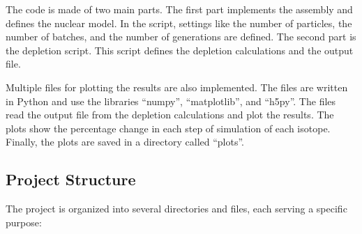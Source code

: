 The code is made of two main parts. The first part implements the assembly and defines the nuclear model. In the script, settings like the number of particles, the number of batches, and the number of generations are defined. The second part is the depletion script. This script defines the depletion calculations and the output file.

Multiple files for plotting the results are also implemented. The files are written in Python and use the libraries ``numpy'', ``matplotlib'', and ``h5py''. The files read the output file from the depletion calculations and plot the results. The plots show the percentage change in each step of simulation of each isotope. Finally, the plots are saved in a directory called ``plots''. 

\subsection{Project Structure}

The project is organized into several directories and files, each serving a specific purpose:

